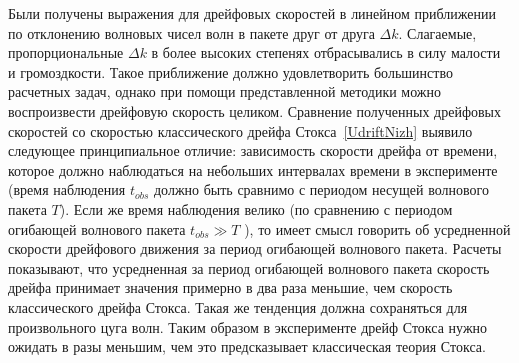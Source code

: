 Были получены выражения для дрейфовых скоростей в линейном приближении по отклонению волновых чисел волн в пакете друг от друга  $ \Delta k $. Слагаемые, пропорциональные $ \Delta k $  в более высоких степенях отбрасывались в силу малости и громоздкости. Такое приближение должно удовлетворить большинство расчетных задач, однако при помощи представленной методики можно воспроизвести дрейфовую скорость целиком. Сравнение полученных дрейфовых скоростей со скоростью классического дрейфа Стокса~\eqref{UdriftNizh} выявило следующее принципиальное отличие: зависимость скорости дрейфа  от времени, которое должно наблюдаться на небольших интервалах времени в эксперименте (время наблюдения $ t_{obs} $  должно быть сравнимо с периодом несущей волнового пакета $ T $). Если же время наблюдения велико (по сравнению с периодом огибающей волнового пакета $ t_{obs}\gg T $ ), то имеет смысл говорить об усредненной скорости дрейфового движения за период огибающей волнового пакета.
Расчеты показывают, что усредненная за период огибающей волнового пакета скорость дрейфа  принимает значения примерно в два раза меньшие, чем скорость классического дрейфа Стокса. Такая же тенденция должна сохраняться для произвольного цуга волн. Таким образом в эксперименте дрейф Стокса нужно ожидать в разы меньшим, чем это предсказывает классическая теория Стокса.

